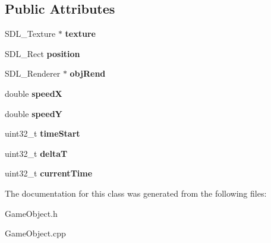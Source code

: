 \subsection*{Public Attributes}
\begin{DoxyCompactItemize}
\item 
\hypertarget{class_game_object_a01accf16dabf8b1006e3df597dc1728a}{}S\+D\+L\+\_\+\+Texture $\ast$ {\bfseries texture}\label{class_game_object_a01accf16dabf8b1006e3df597dc1728a}

\item 
\hypertarget{class_game_object_af6009d73be98a4bd54272d06b50f2eac}{}S\+D\+L\+\_\+\+Rect {\bfseries position}\label{class_game_object_af6009d73be98a4bd54272d06b50f2eac}

\item 
\hypertarget{class_game_object_aca8078da92a2d34889e428708d501246}{}S\+D\+L\+\_\+\+Renderer $\ast$ {\bfseries obj\+Rend}\label{class_game_object_aca8078da92a2d34889e428708d501246}

\item 
\hypertarget{class_game_object_a71fe4978f8508ada95019f5fc77fd8c6}{}double {\bfseries speed\+X}\label{class_game_object_a71fe4978f8508ada95019f5fc77fd8c6}

\item 
\hypertarget{class_game_object_a09a14839f77f2eded95fbf82204e1f1c}{}double {\bfseries speed\+Y}\label{class_game_object_a09a14839f77f2eded95fbf82204e1f1c}

\item 
\hypertarget{class_game_object_a127eb9388ff0cdbbd20f000b24420564}{}uint32\+\_\+t {\bfseries time\+Start}\label{class_game_object_a127eb9388ff0cdbbd20f000b24420564}

\item 
\hypertarget{class_game_object_af52441e1d468ad926cfe265afc6734de}{}uint32\+\_\+t {\bfseries delta\+T}\label{class_game_object_af52441e1d468ad926cfe265afc6734de}

\item 
\hypertarget{class_game_object_a0ee7d3e2f3cfdeba9d924abe12d6739a}{}uint32\+\_\+t {\bfseries current\+Time}\label{class_game_object_a0ee7d3e2f3cfdeba9d924abe12d6739a}

\end{DoxyCompactItemize}


The documentation for this class was generated from the following files\+:\begin{DoxyCompactItemize}
\item 
Game\+Object.\+h\item 
Game\+Object.\+cpp\end{DoxyCompactItemize}

